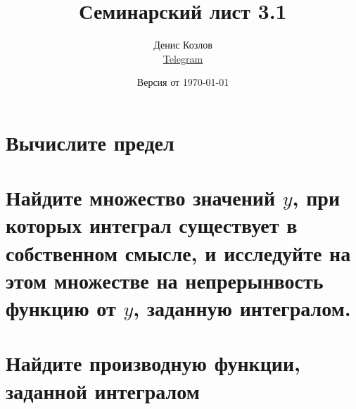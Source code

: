 \documentclass[a4paper, fleqn]{article}
\title{Семинарский лист 3.1}
\author{
    Денис Козлов         \\ \href{https://t.me/DKozl50}{Telegram} \and
}
\date{Версия от {\ddmmyyyydate\today} \currenttime}
\begin{document}
\maketitle

\section*{Вычислите предел}




\section*{Найдите множество значений $y$, при которых интеграл существует в собственном смысле, и
исследуйте на этом множестве на непрерынвость функцию от $y$, заданную интегралом.}




\section*{Найдите производную функции, заданной интегралом}
\end{document}
